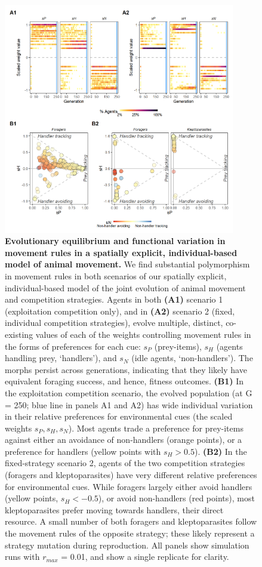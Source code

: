 \begin{figure}[h!]
    \centering
    \includegraphics[width=0.90\textwidth]{figures/patternprocess/fig_01.png}
    \caption{
        \textbf{Evolutionary equilibrium and functional variation in movement rules in a spatially explicit, individual-based model of animal movement.}
        We find substantial polymorphism in movement rules in both scenarios of our spatially explicit, individual-based model of the joint evolution of animal movement and competition strategies.
        Agents in both \textbf{(A1)} scenario 1 (exploitation competition only), and in \textbf{(A2)} scenario 2 (fixed, individual competition strategies), evolve multiple, distinct, co-existing values of each of the weights controlling movement rules in the forms of preferences for each cue: $s_P$ (prey-items), $s_H$ (agents handling prey, `handlers'), and $s_N$ (idle agents, `non-handlers').
        The morphs persist across generations, indicating that they likely have equivalent foraging success, and hence, fitness outcomes.
        \textbf{(B1)} In the exploitation competition scenario, the evolved population (at G = 250; blue line in panels A1 and A2) has wide individual variation in their relative preferences for environmental cues (the scaled weights $s_P, s_H, s_N$).
        Most agents trade a preference for prey-items against either an avoidance of non-handlers (orange points), or a preference for handlers (yellow points with $s_H > 0.5$).
        \textbf{(B2)} In the fixed-strategy scenario 2, agents of the two competition strategies (foragers and kleptoparasites) have very different relative preferences for environmental cues.
        While foragers largely either avoid handlers (yellow points, $s_H < -0.5$), or avoid non-handlers (red points), most kleptoparasites prefer moving towards handlers, their direct resource.
        A small number of both foragers and kleptoparasites follow the movement rules of the opposite strategy; these likely represent a strategy mutation during reproduction.
        All panels show simulation runs with $r_{max}$ = 0.01, and show a single replicate for clarity.
    }
    \label{fig1}
\end{figure}

